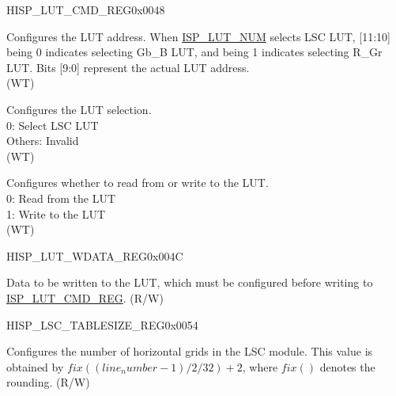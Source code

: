 \begin{register}{H}{ISP\_LUT\_CMD\_REG}{0x0048}\label{regdesc:ISPLUTCMDREG}
%
%
%
%
\regnewline%
\begin{regdesc}\begin{reglist}
\label{fielddesc:ISPLUTADDR}\item [ISP\_LUT\_ADDR] Configures the LUT address. When \hyperref[fielddesc:ISPLUTNUM]{ISP\_LUT\_NUM} selects LSC LUT, [11:10] being 0 indicates selecting Gb\_B LUT, and being 1 indicates selecting R\_Gr LUT. Bits [9:0] represent the actual LUT address.\\(WT)
\label{fielddesc:ISPLUTNUM}\item [ISP\_LUT\_NUM] Configures the LUT selection.\\
0: Select LSC LUT\\Others: Invalid\\(WT)
\label{fielddesc:ISPLUTCMD}\item [ISP\_LUT\_CMD] Configures whether to read from or write to the LUT.\\0: Read from the LUT\\1: Write to the LUT\\(WT)
\end{reglist}\end{regdesc}
\end{register}


\begin{register}{H}{ISP\_LUT\_WDATA\_REG}{0x004C}\label{regdesc:ISPLUTWDATAREG}
%
\regnewline%
\begin{regdesc}\begin{reglist}
\label{fielddesc:ISPLUTWDATA}\item [ISP\_LUT\_WDATA] Data to be written to the LUT, which must be configured before writing to \hyperref[regdesc:ISPLUTCMDREG]{ISP\_LUT\_CMD\_REG}. (R/W)
\end{reglist}\end{regdesc}
\end{register}


\begin{register}{H}{ISP\_LSC\_TABLESIZE\_REG}{0x0054}\label{regdesc:ISPLSCTABLESIZEREG}
%
%
\regnewline%
\begin{regdesc}\begin{reglist}
\label{fielddesc:ISPLSCXTABLESIZE}\item [ISP\_LSC\_XTABLESIZE] Configures the number of horizontal grids in the LSC module. This value is obtained by $fix((line_number -1)/2/32) + 2$, where $fix()$ denotes the rounding. (R/W)
\end{reglist}\end{regdesc}
\end{register}


